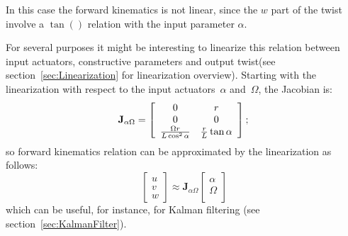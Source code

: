 In this case the forward kinematics is not linear, since the $w$ part of the twist involve a $\tan()$ relation with the input parameter $\alpha$. 

For several purposes it might be interesting to linearize this relation between input actuators, constructive parameters and output twist(see section~\ref{sec:Linearization} for linearization overview). Starting with the linearization with respect to the input actuators~$\alpha$ and~$\Omega$, the Jacobian is: 
\begin{equation}
\mathbf{J}_{\alpha \Omega} = 
\left[
 \begin{array}{cc}
  0 & r  \\
  0 & 0  \\
  \frac{\Omega r}{L \cos ^2 \alpha} & \frac{r}{L}\tan \alpha
 \end{array}
 \right]; \\ 
\end{equation}
 so forward kinematics relation can be approximated by the linearization as follows: 
\begin{equation}
 \left[
 \begin{array}{c}
  u \\
  v  \\
  w 
 \end{array}
 \right] \approx \mathbf{J}_{\alpha \Omega}
 \left[
 \begin{array}{c}
  \alpha \\
  \Omega \\
 \end{array} 
 \right]
\end{equation}
which can be useful, for instance, for Kalman filtering (see section~\ref{sec:KalmanFilter}).

